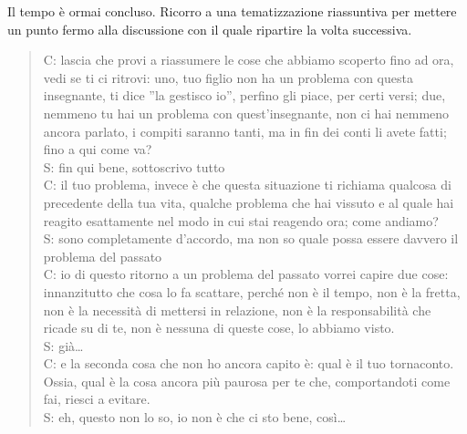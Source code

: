 \noindent Il tempo è ormai concluso. Ricorro a una tematizzazione riassuntiva per mettere un punto fermo alla discussione con il quale ripartire la volta successiva.

\begin{verse}
C: lascia che provi a riassumere le cose che abbiamo scoperto fino ad ora, vedi se ti ci ritrovi: uno, tuo figlio non ha un problema con questa insegnante, ti dice ''la gestisco io'', perfino gli piace, per certi versi; due, nemmeno tu hai un problema con quest'insegnante, non ci hai nemmeno ancora parlato, i compiti saranno tanti, ma in fin dei conti li avete fatti; fino a qui come va?\\
S: fin qui bene, sottoscrivo tutto\\
C: il tuo problema, invece è che questa situazione ti richiama qualcosa di precedente della tua vita, qualche problema che hai vissuto e al quale hai reagito esattamente nel modo in cui stai reagendo ora; come andiamo?\\
S: sono completamente d'accordo, ma non so quale possa essere davvero il problema del passato\\
C: io di questo ritorno a un problema del passato vorrei capire due cose: innanzitutto che cosa lo fa scattare, perché non è il tempo, non è la fretta, non è la necessità di mettersi in relazione, non è la responsabilità che ricade su di te, non è nessuna di queste cose, lo abbiamo visto.\\
S: già\ldots\\
C: e la seconda cosa che non ho ancora capito è: qual è il tuo tornaconto. Ossia, qual è la cosa ancora più paurosa per te che, comportandoti come fai, riesci a evitare.\\
S: eh, questo non lo so, io non è che ci sto bene, così\ldots\\
\end{verse}
